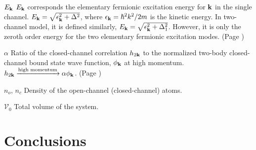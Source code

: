 \documentclass[edeposit,fullpage,prequest]{uiucthesis2009}
\begin{document}
\begin{symbollist}[0.7in]
\item[$E_{\mathbf{k}}$] $E_{\mathbf{k}}$ corresponds the elementary fermionic excitation energy for $\mathbf{k}$ in the single channel.  $E_{\mathbf{k}}=\sqrt{\epsilon_{\mathbf{k}}^{2}+\Delta^{2}}$, where $\epsilon_{\mathbf{k}}=\hbar^{2}k^{2}/2m$ is the kinetic energy. In two-channel model, it is defined similarly, $E_{\mathbf{k}}=\sqrt{\epsilon_{\mathbf{k}}^{2}+\Delta_{1}^{2}}$. However, it is only the zeroth order   energy for the two elementary fermionic excitation modes. (Page \pageref{eq:pathInt:G0})
\item[$\alpha$]  Ratio of the closed-channel correlation $h_{2\mathbf{k}}$ to the normalized two-body closed-channel bound state wave function, $\phi_{\mathbf{k}}$ at high momentum.  $h_{2\mathbf{k}}\xrightarrow{\text{high momentum}}\alpha\phi_{\mathbf{k}}$. (Page \pageref{eq:pathInt2:hphi})
\item[$n_{o}$, $n_{c}$] Density of the open-channel (closed-channel) atoms. 
\item[$\mathcal{V}_{0}$]  Total volume of the system. 
\end{symbollist}

\mainmatter




\chapter{Conclusions\label{ch:conclusion}}


\appendix

%



\backmatter



\end{document}
